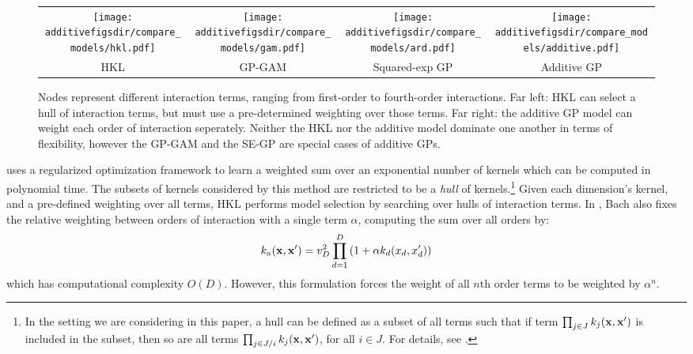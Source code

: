 \begin{figure}
\centering
\begin{tabular}{c|c|c|c}
\hspace{-0.06in} \texttt{[image: \\additivefigsdir/compare\_models/hkl.pdf]} \hspace{-0.07in} &
\hspace{-0.06in} \texttt{[image: \\additivefigsdir/compare\_models/gam.pdf]} \hspace{-0.07in} &
\hspace{-0.06in} \texttt{[image: \\additivefigsdir/compare\_models/ard.pdf]} \hspace{-0.07in} &
\hspace{-0.06in} \texttt{[image: \\additivefigsdir/compare\_models/additive.pdf]} \\
HKL & GP-GAM & Squared-exp GP & Additive GP
\end{tabular}
\caption{
Nodes represent different interaction terms, ranging from first-order to fourth-order interactions.  Far left:  HKL can select a hull of interaction terms, but must use a pre-determined weighting over those terms.  Far right: the additive GP model can weight each order of interaction seperately.  Neither the HKL nor the additive model dominate one another in terms of flexibility, however the GP-GAM and the SE-GP are special cases of additive GPs. }
\label{hulls-figure}
\end{figure}

\cite{DBLP:journals/corr/abs-0909-0844} uses a regularized optimization framework to learn a weighted sum over an exponential number of kernels which can be computed in polynomial time.  The subsets of kernels considered by this method are restricted to be a \textit{hull} of kernels.\footnote{In the setting we are considering in this paper, a hull can be defined as a subset of all terms such that if term $\prod_{j \in J} k_j(\bf x, x')$ is included in the subset, then so are all terms $\prod_{j \in J / i} k_j(\bf x, x')$, for all $i \in J$.  For details, see \cite{DBLP:journals/corr/abs-0909-0844}.}
Given each dimension's kernel, and a pre-defined weighting over all terms, HKL performs model selection by searching over hulls of interaction terms.
In \cite{DBLP:journals/corr/abs-0909-0844}, Bach also fixes the relative weighting between orders of interaction with a single term $\alpha$, computing the sum over all orders by:
\begin{equation}
\label{eqn:uniform}
k_{a}({\bf x, x'}) = v_D^2 \prod_{d=1}^D \left(1 + \alpha k_{d}(x_{d}, x_{d}') \right)
\end{equation}
which has computational complexity $O(D)$.  However, this formulation forces the weight of all $n$th order terms to be weighted by $\alpha^n$.

